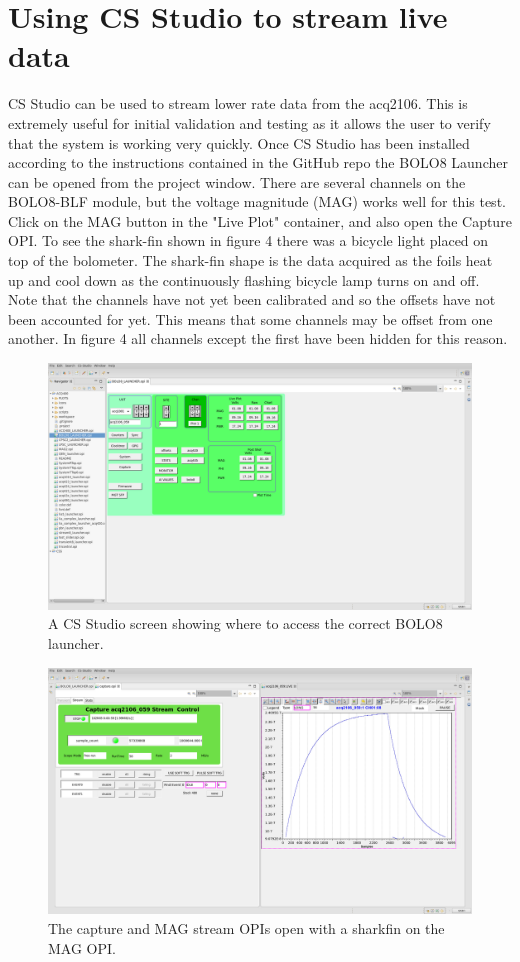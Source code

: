 \documentclass{article}
\begin{document}
\newpage

\section{Using CS Studio to stream live data}
CS Studio can be used to stream lower rate data from the acq2106.
This is extremely useful for initial validation and testing as it allows the user to verify that the system is working very quickly.
Once CS Studio has been installed according to the instructions contained in the GitHub repo the BOLO8 Launcher can be opened from the project window.
There are several channels on the BOLO8-BLF module, but the voltage magnitude (MAG) works well for this test.
Click on the MAG button in the "Live Plot" container, and also open the Capture OPI.
To see the shark-fin shown in figure 4 there was a bicycle light placed on top of the bolometer.
The shark-fin shape is the data acquired as the foils heat up and cool down as the continuously flashing bicycle lamp turns on and off.
Note that the channels have not yet been calibrated and so the offsets have not been accounted for yet.
This means that some channels may be offset from one another.
In figure 4 all channels except the first have been hidden for this reason.

\begin{figure}
	\centering
	\includegraphics[width=5.0in]{images/css-launcher.png}
	\caption{A CS Studio screen showing where to access the correct BOLO8 launcher.}
	\label{boloZIFimage}
\end{figure}

\begin{figure}
	\centering
	\includegraphics[width=5.0in]{images/shark-fin-ch1.png}
	\caption{The capture and MAG stream OPIs open with a sharkfin on the MAG OPI.}
	\label{boloZIFimage}
\end{figure}
\end{document}
